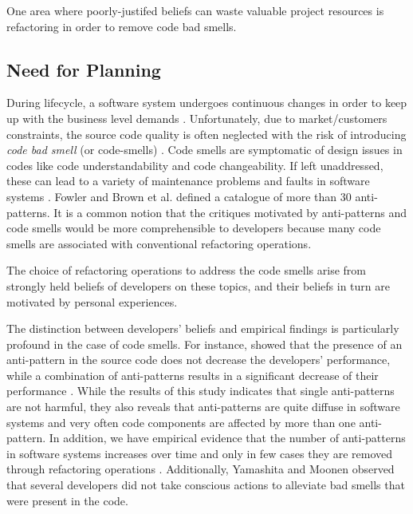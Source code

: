 \documentclass{sig-alternate}
\begin{document}
One area where poorly-justifed beliefs can waste valuable project resources is
refactoring in order to remove code bad smells.









\subsection{Need for Planning}
During lifecycle, a software system undergoes continuous changes in order to keep up with the business level demands \cite{lehman79}. Unfortunately, due to market/customers constraints, the source code quality is often neglected with the risk of introducing \textit{code bad smell} (or code-smells) \cite{fowler09}. Code smells are symptomatic of design issues in codes like code understandability and code changeability. If left unaddressed, these can lead to a variety of maintenance problems and faults in software systems \cite{fowler09}\cite{marinescu06}. Fowler \cite{fowler09} and Brown et al. \cite{brown98} defined a catalogue of more than 30 anti-patterns. It is a common notion that the critiques motivated by anti-patterns and code smells would be more comprehensible to developers because many code smells are associated with conventional refactoring operations. 

The choice of refactoring operations to address the code smells arise from strongly held beliefs of developers on these topics, and their beliefs in turn are motivated by personal experiences. 

The distinction between developers' beliefs and empirical findings is particularly profound in the case of code smells. For instance, \cite{abbes11} showed that the presence of an anti-pattern in the source code does not decrease the developers' performance, while a combination of anti-patterns results in a significant decrease of their performance \cite{abbes11}\cite{yama13}. While the results of this study indicates that single anti-patterns are not harmful, they also reveals that anti-patterns are quite diffuse in software systems and very often code components are affected by more than one anti-pattern. In addition, we have empirical evidence that the number of anti-patterns in software systems increases over time and only in few cases they are removed through refactoring operations \cite{arcoverde11}\cite{chatzigeorgiou10}. Additionally, Yamashita and Moonen\cite{} observed that several developers did not take conscious actions to alleviate bad smells that were present in the code. 
\end{document}
